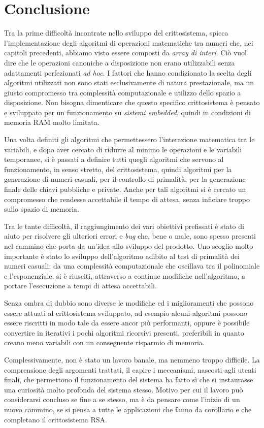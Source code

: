 \chapter{Conclusione}

Tra la prime difficoltà incontrate nello sviluppo del crittosistema, spicca l'implementazione degli algoritmi di operazioni matematiche tra numeri che, nei capitoli precedenti, abbiamo visto essere composti da \emph{array di interi}. Ciò vuol dire che le operazioni canoniche a disposizione non erano utilizzabili senza adattamenti perfezionati \emph{ad hoc}. I fattori che hanno condizionato la scelta degli algoritmi utilizzati non sono stati esclusivamente di natura prestazionale, ma un giusto compromesso tra complessità computazionale e utilizzo dello spazio a disposizione. Non bisogna dimenticare che questo specifico crittosistema è pensato e sviluppato per un funzionamento su \emph{sistemi embedded}, quindi in condizioni di memoria RAM molto limitata.

Una volta definiti gli algoritmi che permettessero l'interazione matematica tra le variabili, e dopo aver cercato di ridurre al minimo le operazioni e le variabili temporanee, si è passati a definire tutti quegli algoritmi che servono al funzionamento, in senso stretto, del crittosistema, quindi algoritmi per la generazione di numeri casuali, per il controllo di primalità, per la generazione finale delle chiavi pubbliche e private. Anche per tali algoritmi si è cercato un compromesso che rendesse accettabile il tempo di attesa, senza inficiare troppo sullo spazio di memoria.

Tra le tante difficoltà, il raggiungimento dei vari obiettivi prefissati è stato di aiuto per risolvere gli ulteriori errori e \emph{bug} che, bene o male, sono spesso presenti nel cammino che porta da un'idea allo sviluppo del prodotto. Uno scoglio molto importante è stato lo sviluppo dell'algoritmo adibito al test di primalità dei numeri casuali: da una complessità computazionale che oscillava tra il polinomiale e l'esponenziale, si è riusciti, attraverso a continue modifiche nell'algoritmo, a portare l'esecuzione a tempi di attesa accettabili. 

Senza ombra di dubbio sono diverse le modifiche ed i miglioramenti che possono essere attuati al crittosistema sviluppato, ad esempio alcuni algoritmi possono essere riscritti in modo tale da essere ancor più performanti, oppure è possibile convertire in iterativi i pochi algoritmi ricorsivi presenti, preferibili in quanto creano meno variabili con un conseguente risparmio di memoria.

Complessivamente, non è stato un lavoro banale, ma nemmeno troppo difficile. La comprensione degli argomenti trattati, il capire i meccanismi, nascosti agli utenti finali, che permettono il funzionamento del sistema ha fatto sì che si instaurasse una curiosità molto profonda del sistema stesso. Motivo per cui il lavoro può considerarsi concluso se fine a se stesso, ma è da pensare come l'inizio di un nuovo cammino, se si pensa a tutte le applicazioni che fanno da corollario e che completano il crittosistema RSA.